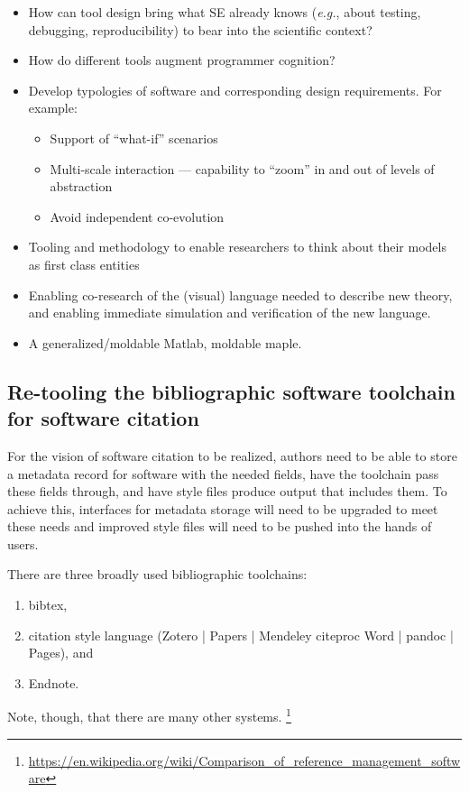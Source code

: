 \documentclass[a4paper,UKenglish]{dagman}
\newcommand{\eg}{\emph{e.g.},\xspace}
\begin{document}
\begin{itemize}
\item How can tool design bring what SE already knows (\eg about testing, debugging, reproducibility) to bear into the scientific context?
\item How do different tools augment programmer cognition?
\item Develop typologies of software and corresponding design requirements. For example:
    \begin{itemize}
    \item Support of ``what-if'' scenarios
    \item Multi-scale interaction --- capability to ``zoom'' in and out of levels of abstraction
    \item Avoid independent co-evolution
    \end{itemize}
\item Tooling and methodology to enable researchers to think about their models as first class entities
\item Enabling co-research of the (visual) language needed to describe new theory, and enabling immediate simulation and verification of the new language.
\item A generalized/moldable Matlab, moldable maple.
\end{itemize}

\subsection{Re-tooling the bibliographic software toolchain for software citation}

For the vision of software citation to be realized, authors need to be able to store a metadata record for software with the needed fields, have the toolchain pass these fields through, and have style files produce output that includes them. To achieve this, interfaces for metadata storage will need to be upgraded to meet these needs and improved style files will need to be pushed into the hands of users.

There are three broadly used bibliographic toolchains:
\begin{enumerate}
\item bibtex,
\item citation style language (Zotero | Papers | Mendeley \ra citeproc \ra Word | pandoc | Pages),  and \item Endnote.
\end{enumerate}
Note, though, that there are many other systems.%
\footnote{\url{https://en.wikipedia.org/wiki/Comparison_of_reference_management_software}}
\end{document}
